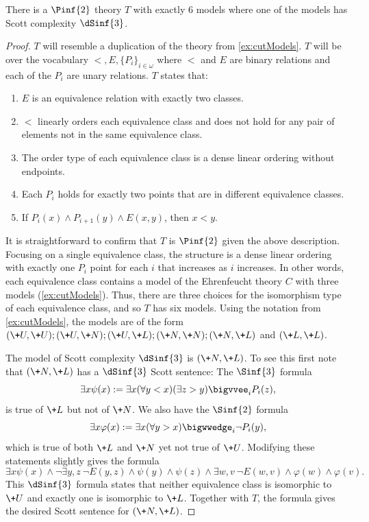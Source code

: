 \documentclass[10pt,a4paper]{amsart}
\renewcommand{\-}{\text{-}}
\begin{document}
\begin{proposition}
There is a $\Pinf{2}$ theory $T$ with exactly 6 models where one of the models has Scott complexity $\dSinf{3}$.
\end{proposition}

\begin{proof}
$T$ will resemble a duplication of the theory from \cref{ex:cutModels}.
$T$ will be over the vocabulary $<,E,\{P_i\}_{i\in\omega}$ where $<$ and $E$ are binary relations and each of the $P_i$ are unary relations.
$T$ states that:
\begin{enumerate}
	\item $E$ is an equivalence relation with exactly two classes.
	\item $<$ linearly orders each equivalence class and does not hold for any pair of elements not in the same equivalence class.
	\item The order type of each equivalence class is a dense linear ordering without endpoints.
	\item Each $P_i$ holds for exactly two points that are in different equivalence classes.
	\item If $P_i(x)\land P_{i+1}(y) \land E(x,y)$, then $x<y$.
\end{enumerate}
It is straightforward to confirm that $T$ is $\Pinf{2}$ given the above description.
Focusing on a single equivalence class, the structure is a dense linear ordering with exactly one $P_i$ point for each $i$ that increases as $i$ increases.
In other words, each equivalence class contains a model of the Ehrenfeucht theory $C$ with three models (\cref{ex:cutModels}).
Thus, there are three choices for the isomorphism type of each equivalence class, and so $T$ has six models.
Using the notation from \cref{ex:cutModels}, the models are of the form $(\+U,\+U);(\+U,\+N);(\+U,\+L);(\+N,\+N);(\+N,\+L)$ and $(\+L,\+L)$.

The model of Scott complexity $\dSinf{3}$ is $(\+N,\+L)$.
To see this first note that $(\+N,\+L)$ has a $\dSinf{3}$ Scott sentence:
The $\Sinf{3}$ formula 
\[\exists x\psi(x):=\exists x (\forall y<x) (\exists z>y) \bigvvee_i P_i(z),\]
is true of $\+L$ but not of $\+N$.
We also have the $\Sinf{2}$ formula
\[\exists x\varphi(x):=\exists x(\forall y>x) \bigwwedge_i \lnot P_i(y),\]
which is true of both $\+L$ and $\+N$ yet not true of $\+U$.
Modifying these statements slightly gives the formula
\[\exists x\psi(x) \land \lnot\exists y,z \ \lnot E(y,z) \land \psi(y) \land \psi(z) \land \exists w,v \ \lnot E(w,v) \land \varphi(w) \land \varphi(v).\]
This $\dSinf{3}$ formula states that neither equivalence class is isomorphic to $\+U$ and exactly one is isomorphic to $\+L$.
Together with $T$, the formula gives the desired Scott sentence for $(\+N,\+L)$.


\end{proof}
\end{document}
